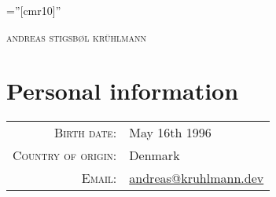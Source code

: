 \documentclass[a4paper,10pt]{article}
\begin{document}
\pagestyle{empty}

\font\fb=''[cmr10]''

\par{\centering
		{\Huge \textsc{andreas stigsb\o l kr\"uhlmann}
	}\bigskip\par}

\section{Personal information}
\begin{tabular}{rl}
    \textsc{Birth date:} & May 16th 1996\\
    \textsc{Country of origin:} & Denmark\\
    \textsc{Email:} & \href{mailto:andreas@kruhlmann.dev}{andreas@kruhlmann.dev} \\
\end{tabular}
\end{document}
